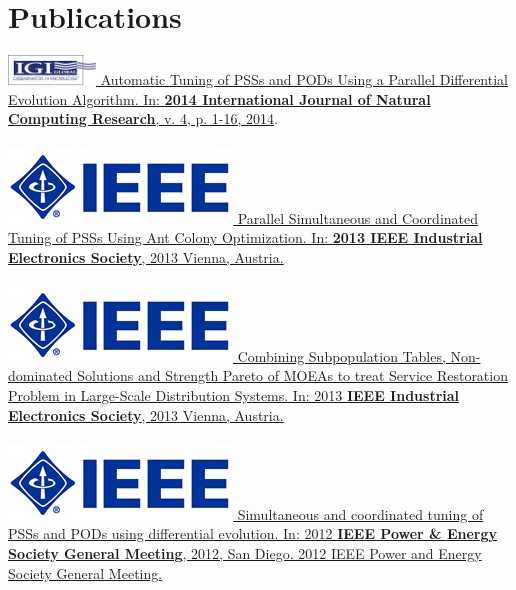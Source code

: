 \documentclass[]{friggeri-cv}
\begin{document}
%


\section{Publications}

\href{http://dx.doi.org/10.4018/ijncr.2014010101}{\includegraphics[height=\fontcharht\font`\B]{img/igi_global_.png} Automatic Tuning of PSSs and PODs Using a Parallel Differential Evolution Algorithm. In: \textbf{2014 International Journal of Natural Computing Research}, v. 4, p. 1-16, 2014}.\\
\\
\href{http://dx.doi.org/10.1109/IECON.2013.6699462}{\includegraphics[scale=0.11]{img/ieee.jpg} Parallel Simultaneous and Coordinated Tuning of PSSs Using Ant Colony Optimization. In: \textbf{2013 IEEE Industrial Electronics Society}, 2013 Vienna, Austria.}\\
\\
\href{http://dx.doi.org/10.1109/IECON.2013.6699436}{\includegraphics[scale=0.11]{img/ieee.jpg} Combining Subpopulation Tables, Non-dominated Solutions and Strength Pareto of MOEAs to treat Service Restoration Problem in Large-Scale Distribution Systems. In: 2013 \textbf{IEEE Industrial Electronics Society}, 2013 Vienna, Austria.}\\
\\
\href{http://dx.doi.org/10.1109/PESGM.2012.6345340}{\includegraphics[scale=0.11]{img/ieee.jpg} Simultaneous and coordinated tuning of PSSs and PODs using differential evolution. In: 2012 \textbf{IEEE Power \& Energy Society General Meeting}, 2012, San Diego. 2012 IEEE Power and Energy Society General Meeting.}\\
\\
\end{document}
